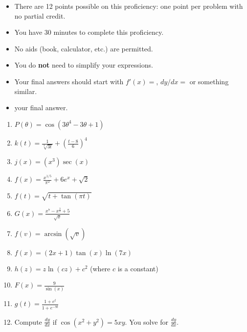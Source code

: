\documentclass[12pt]{article}
\newcommand{\ds}{\displaystyle}
\begin{document}
\begin{itemize}
\item 
There are 12 points possible on this proficiency: one point per problem with
no partial credit. 

\item You have 30 minutes to complete this proficiency.

\item No aids (book, calculator, etc.) are permitted.  

\item You do \textbf{not} need to simplify your expressions.

\item Your final answers should start with $f'(x)=$, $dy/dx=$ or
something similar.

\item {} your final answer.
\end{itemize}

\begin{enumerate}
\item $\ds P(\theta) = \cos(3\theta^{4} - 3\theta+1)$ \vfill
\item $\ds  k(t) = \frac{1}{\sqrt[3]{3t}} + \left( \frac{t-8}{6} \right)^{4}$ \vfill
\item $\ds j(x) = \left(x^{3}\right) \sec(x)$\vfill
\newpage
\item $\ds f(x) = \frac{x^{1/5}}{\pi^2} + 6e^{x} + \sqrt{2}$\vfill
\item $\ds f(t) = \sqrt{t+\tan(\pi t)}$\vfill
\item $\ds G(x) = \frac{x^{7} - x^{\frac{3}{2}} + 5}{\sqrt{x}}$ \vfill

\newpage
\item $\ds f(v) =  \arcsin(\sqrt{v})$ \vfill
\item $\ds f(x) = (2x+1)\tan(x) \ln(7x)$ \vfill
\item $\ds h(z) = z \ln(cz) + c^{2}$ (where $c$ is a constant) \vfill
\newpage
\item $\ds F(x) = \frac{9}{\sin(x)}$ \vfill
\item $\ds g(t) = \frac{1+e^{t}}{1+e^{-9t}}$ \vfill
\item Compute $\frac{dy}{dx}$ if $\cos(x^{2}+ y^{2}) = 5xy$. You  solve for $\frac{dy}{dx}$.
\vspace{3.5in}


\end{enumerate}
\end{document}
